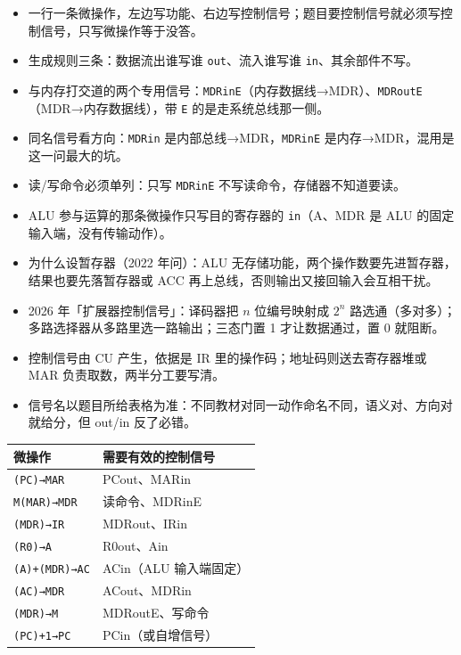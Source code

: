 \documentclass[10pt,a4paper]{ctexart}
\begin{document}
\begin{itemize}

\item 一行一条微操作，左边写功能、右边写控制信号；题目要控制信号就必须写控制信号，只写微操作等于没答。

\item 生成规则三条：数据流出谁写谁 \texttt{out}、流入谁写谁 \texttt{in}、其余部件不写。

\item 与内存打交道的两个专用信号：\texttt{MDRinE}（内存数据线→MDR）、\texttt{MDRoutE}（MDR→内存数据线），带 \texttt{E} 的是走系统总线那一侧。

\item 同名信号看方向：\texttt{MDRin} 是内部总线→MDR，\texttt{MDRinE} 是内存→MDR，混用是这一问最大的坑。

\item 读/写命令必须单列：只写 \texttt{MDRinE} 不写读命令，存储器不知道要读。

\item ALU 参与运算的那条微操作只写目的寄存器的 \texttt{in}（A、MDR 是 ALU 的固定输入端，没有传输动作）。

\item 为什么设暂存器（2022 年问）：ALU 无存储功能，两个操作数要先进暂存器，结果也要先落暂存器或 ACC 再上总线，否则输出又接回输入会互相干扰。

\item 2026 年「扩展器控制信号」：译码器把 $n$ 位编号映射成 $2^{n}$ 路选通（多对多）；多路选择器从多路里选一路输出；三态门置 1 才让数据通过，置 0 就阻断。

\item 控制信号由 CU 产生，依据是 IR 里的操作码；地址码则送去寄存器堆或 MAR 负责取数，两半分工要写清。

\item 信号名以题目所给表格为准：不同教材对同一动作命名不同，语义对、方向对就给分，但 out/in 反了必错。

\end{itemize}

\begin{center}\small
\begin{tabularx}{\linewidth}{@{}l>{\raggedright\arraybackslash}X@{}}
\toprule
微操作 & 需要有效的控制信号 \\
\midrule
\texttt{(PC)→MAR} & PCout、MARin \\
\texttt{M(MAR)→MDR} & 读命令、MDRinE \\
\texttt{(MDR)→IR} & MDRout、IRin \\
\texttt{(R0)→A} & R0out、Ain \\
\texttt{(A)+(MDR)→AC} & ACin（ALU 输入端固定） \\
\texttt{(AC)→MDR} & ACout、MDRin \\
\texttt{(MDR)→M} & MDRoutE、写命令 \\
\texttt{(PC)+1→PC} & PCin（或自增信号） \\
\bottomrule
\end{tabularx}
\end{center}
\end{document}
